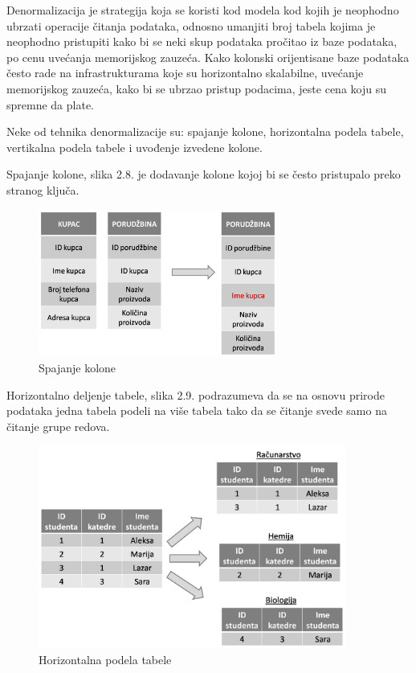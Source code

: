 \documentclass[12pt,oneside]{memoir}
\begin{document}
Denormalizacija je strategija koja se koristi kod modela kod kojih je neophodno ubrzati operacije čitanja podataka, odnosno umanjiti broj tabela kojima je neophodno pristupiti kako bi se neki skup podataka pročitao iz baze podataka, po cenu uvećanja memorijskog zauzeća. Kako kolonski orijentisane baze podataka često rade na infrastrukturama koje su horizontalno skalabilne, uvećanje memorijskog zauzeća, kako bi se ubrzao pristup podacima, jeste cena koju su spremne da plate.
 
Neke od tehnika denormalizacije su:  spajanje kolone, horizontalna podela tabele, vertikalna podela tabele i uvođenje izvedene kolone. 

Spajanje kolone, slika 2.8. je dodavanje kolone kojoj bi se često pristupalo preko stranog ključa.

\begin{figure}[!ht]
  \centering
  \includegraphics[width=0.7\textwidth]{denormalizacija.png}
  \caption{Spajanje kolone}
  \label{fig:grafikon}
\end{figure}

Horizontalno deljenje tabele, slika 2.9. podrazumeva da se na osnovu prirode podataka jedna tabela podeli na više tabela tako da se čitanje svede samo na čitanje grupe redova. 

\begin{figure}[!ht]
  \centering
  \includegraphics[width=0.9\textwidth]{denormalizacija2.png}
  \caption{Horizontalna podela tabele}
  \label{fig:grafikon}
\end{figure}
\end{document}
